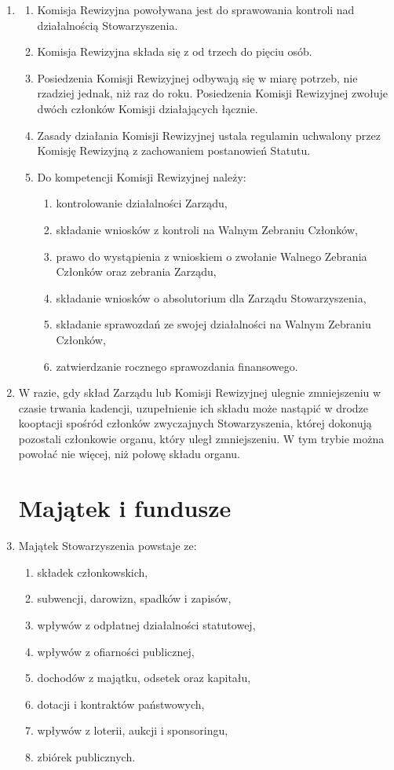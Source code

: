 \documentclass[chapterprefix,notitlepage]{article}
\begin{document}
\begin{enumerate}
	\item \begin{enumerate}
		\item Komisja Rewizyjna powoływana jest do sprawowania kontroli nad działalnością Stowarzyszenia.
		\item Komisja Rewizyjna składa się z od trzech do pięciu osób.
		\item[2a.] Posiedzenia Komisji Rewizyjnej odbywają się w miarę potrzeb, nie rzadziej jednak, niż raz do roku. Posiedzenia Komisji Rewizyjnej zwołuje dwóch członków Komisji działających łącznie.
		\item[2b.] Zasady działania Komisji Rewizyjnej ustala regulamin uchwalony przez Komisję Rewizyjną z zachowaniem postanowień Statutu.
		\item Do kompetencji Komisji Rewizyjnej należy:
		\begin{enumerate}
			\item kontrolowanie działalności Zarządu,
			\item składanie wniosków z kontroli na Walnym Zebraniu Członków,
			\item prawo do wystąpienia z wnioskiem o zwołanie Walnego Zebrania Członków oraz zebrania Zarządu,
			\item składanie wniosków o absolutorium dla Zarządu Stowarzyszenia,
			\item składanie sprawozdań ze swojej działalności na Walnym Zebraniu Członków,
			\item zatwierdzanie rocznego sprawozdania finansowego.
		\end{enumerate}
	\end{enumerate}

	\item W razie, gdy skład Zarządu lub Komisji Rewizyjnej ulegnie zmniejszeniu w czasie trwania kadencji, uzupełnienie ich składu może nastąpić w drodze kooptacji spośród członków zwyczajnych Stowarzyszenia, której dokonują pozostali członkowie organu, który uległ zmniejszeniu. W tym trybie można powołać nie więcej, niż połowę składu organu.


\section{Majątek i fundusze}

	\item Majątek Stowarzyszenia powstaje ze:
	\begin{enumerate}[1)]
		\item składek członkowskich,
		\item subwencji, darowizn, spadków i zapisów,
		\item wpływów z odpłatnej działalności statutowej,
		\item wpływów z ofiarności publicznej,
		\item dochodów z majątku, odsetek oraz kapitału,
		\item dotacji i kontraktów państwowych,
		\item wpływów z loterii, aukcji i sponsoringu,
		\item zbiórek publicznych.
	\end{enumerate}
	

\end{enumerate}
\end{document}

